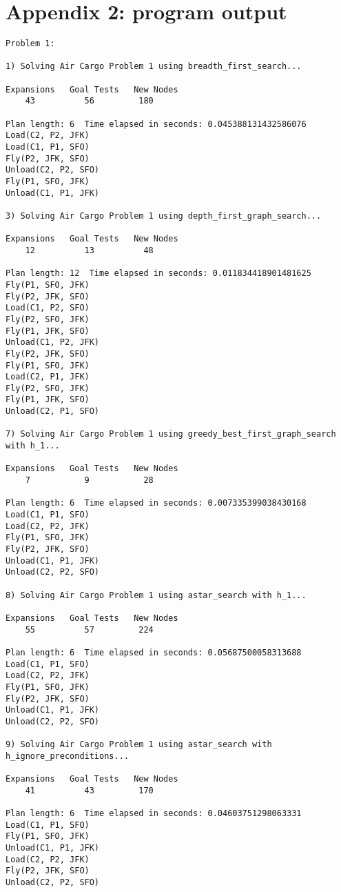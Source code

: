 \documentclass[11pt]{scrartcl}
\begin{document}
\section*{Appendix 2: program output}\label{appendix-2-program-output}
\begin{verbatim}
Problem 1:

1) Solving Air Cargo Problem 1 using breadth_first_search...

Expansions   Goal Tests   New Nodes
    43          56         180

Plan length: 6  Time elapsed in seconds: 0.045388131432586076
Load(C2, P2, JFK)
Load(C1, P1, SFO)
Fly(P2, JFK, SFO)
Unload(C2, P2, SFO)
Fly(P1, SFO, JFK)
Unload(C1, P1, JFK)

3) Solving Air Cargo Problem 1 using depth_first_graph_search...

Expansions   Goal Tests   New Nodes
    12          13          48

Plan length: 12  Time elapsed in seconds: 0.011834418901481625
Fly(P1, SFO, JFK)
Fly(P2, JFK, SFO)
Load(C1, P2, SFO)
Fly(P2, SFO, JFK)
Fly(P1, JFK, SFO)
Unload(C1, P2, JFK)
Fly(P2, JFK, SFO)
Fly(P1, SFO, JFK)
Load(C2, P1, JFK)
Fly(P2, SFO, JFK)
Fly(P1, JFK, SFO)
Unload(C2, P1, SFO)

7) Solving Air Cargo Problem 1 using greedy_best_first_graph_search with h_1...

Expansions   Goal Tests   New Nodes
    7           9           28

Plan length: 6  Time elapsed in seconds: 0.007335399038430168
Load(C1, P1, SFO)
Load(C2, P2, JFK)
Fly(P1, SFO, JFK)
Fly(P2, JFK, SFO)
Unload(C1, P1, JFK)
Unload(C2, P2, SFO)

8) Solving Air Cargo Problem 1 using astar_search with h_1...

Expansions   Goal Tests   New Nodes
    55          57         224

Plan length: 6  Time elapsed in seconds: 0.05687500058313688
Load(C1, P1, SFO)
Load(C2, P2, JFK)
Fly(P1, SFO, JFK)
Fly(P2, JFK, SFO)
Unload(C1, P1, JFK)
Unload(C2, P2, SFO)

9) Solving Air Cargo Problem 1 using astar_search with h_ignore_preconditions...

Expansions   Goal Tests   New Nodes
    41          43         170

Plan length: 6  Time elapsed in seconds: 0.04603751298063331
Load(C1, P1, SFO)
Fly(P1, SFO, JFK)
Unload(C1, P1, JFK)
Load(C2, P2, JFK)
Fly(P2, JFK, SFO)
Unload(C2, P2, SFO)


\end{verbatim}
\end{document}
